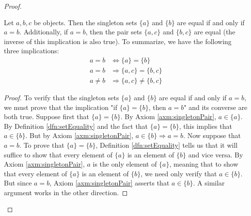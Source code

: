 \documentclass[../main.tex]{subfiles}
\begin{document}
\begin{enumerate}[ref={\thesection.\arabic*}]
\begin{proof}
        \begin{lem}\label{lem:singletonPairSetEquality}
            Let $a,b,c$ be objects. Then the singleton sets $\{a\}$ and $\{b\}$ are equal if and only if $a=b$. Additionally, if $a=b$, then the pair sets $\{a,c\}$ and $\{b,c\}$ are equal (the inverse of this implication is also true). To summarize, we have the following three implications:
            \begin{align*}
                a=b &\Longleftrightarrow \{a\}=\{b\}\\
                a=b &\Longrightarrow \{a,c\}=\{b,c\}\\
                a\neq b &\Longrightarrow \{a,c\}\neq\{b,c\}
            \end{align*}
            \begin{proof}
                To verify that the singleton sets $\{a\}$ and $\{b\}$ are equal if and only if $a=b$, we must prove that the implication "if $\{a\}=\{b\}$, then $a=b$" and its converse are both true. Suppose first that $\{a\}=\{b\}$. By Axiom \ref{axm:singletonPair}, $a\in\{a\}$. By Definition \ref{dfn:setEquality} and the fact that $\{a\}=\{b\}$, this implies that $a\in\{b\}$. But by Axiom \ref{axm:singletonPair}, $a\in\{b\} \Longrightarrow a=b$. Now suppose that $a=b$. To prove that $\{a\}=\{b\}$, Definition \ref{dfn:setEquality} tells us that it will suffice to show that every element of $\{a\}$ is an element of $\{b\}$ and vice versa. By Axiom \ref{axm:singletonPair}, $a$ is the only element of $\{a\}$, meaning that to show that every element of $\{a\}$ is an element of $\{b\}$, we need only verify that $a\in\{b\}$. But since $a=b$, Axiom \ref{axm:singletonPair} asserts that $a\in\{b\}$. A similar argument works in the other direction.\par

\end{proof}
\end{lem}
\end{proof}
\end{enumerate}
\end{document}
